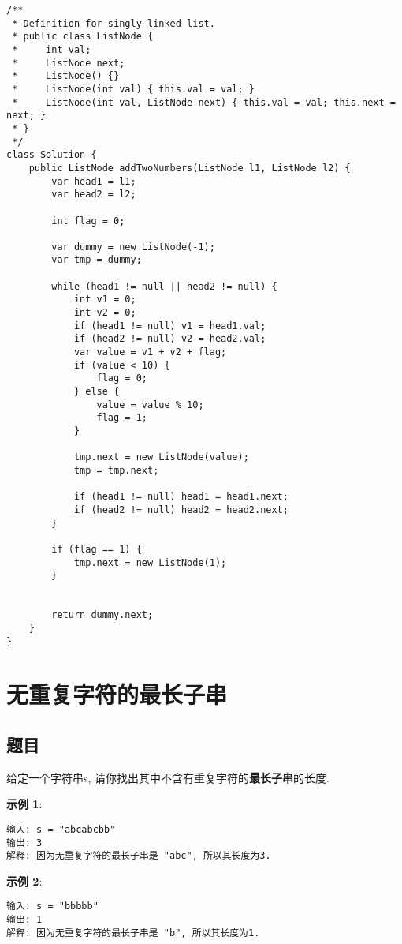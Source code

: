 \documentclass[oneside]{ctexbook}
\begin{document}
\begin{verbatim}
/**
 * Definition for singly-linked list.
 * public class ListNode {
 *     int val;
 *     ListNode next;
 *     ListNode() {}
 *     ListNode(int val) { this.val = val; }
 *     ListNode(int val, ListNode next) { this.val = val; this.next = next; }
 * }
 */
class Solution {
    public ListNode addTwoNumbers(ListNode l1, ListNode l2) {
        var head1 = l1;
        var head2 = l2;

        int flag = 0;

        var dummy = new ListNode(-1);
        var tmp = dummy;

        while (head1 != null || head2 != null) {
            int v1 = 0;
            int v2 = 0;
            if (head1 != null) v1 = head1.val;
            if (head2 != null) v2 = head2.val;
            var value = v1 + v2 + flag;
            if (value < 10) {
                flag = 0;
            } else {
                value = value % 10;
                flag = 1;
            }

            tmp.next = new ListNode(value);
            tmp = tmp.next;

            if (head1 != null) head1 = head1.next;
            if (head2 != null) head2 = head2.next;
        }

        if (flag == 1) {
            tmp.next = new ListNode(1);
        }


        return dummy.next;
    }
}
\end{verbatim}

\chapter{无重复字符的最长子串}

\section{题目}

给定一个字符串s, 请你找出其中不含有重复字符的\textbf{最长子串}的长度.

\textbf{示例 1}:

\begin{verbatim}
输入: s = "abcabcbb"
输出: 3 
解释: 因为无重复字符的最长子串是 "abc", 所以其长度为3.
\end{verbatim}

\textbf{示例 2}:

\begin{verbatim}
输入: s = "bbbbb"
输出: 1
解释: 因为无重复字符的最长子串是 "b", 所以其长度为1.
\end{verbatim}
\end{document}
